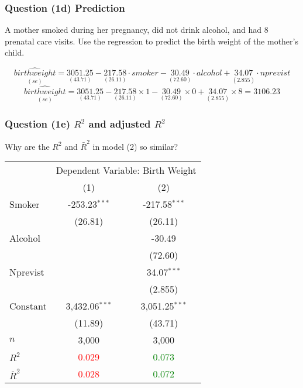 \documentclass[11pt, xcolor=x11names,compress]{beamer}
\begin{document}
\begin{frame}[fragile,t]
\frametitle{Question (1d) Prediction}
A mother smoked during her pregnancy, did not drink alcohol, and had 8 prenatal care visits. Use the regression to predict the birth weight of the mother’s child.

\pause
\begin{equation*}
    \underset{(se)}{\widehat{birthweight}} = \underset{(43.71)}{3051.25} - \underset{(26.11)}{217.58} \cdot smoker - \underset{(72.60)}{30.49}\cdot alcohol + 
    \underset{(2.855)}{34.07}\cdot nprevist
\end{equation*}
\begin{equation*}
    \underset{(se)}{\widehat{birthweight}} = \underset{(43.71)}{3051.25} - \underset{(26.11)}{217.58} \times 1 - \underset{(72.60)}{30.49}\times 0 + 
    \underset{(2.855)}{34.07}\times 8 = 3106.23
\end{equation*}

\end{frame}

\begin{frame}[fragile,t]
\frametitle{Question (1e) $R^2$ and adjusted $R^2$}\label{R2b}
Why are the $R^2$ and $\bar{R}^2$ in model (2) so similar?
\hyperlink{R2}{}
\begin{center}
\begin{threeparttable}
\begin{tabular}{lcc}
\hline 
 & \multicolumn{2}{c}{Dependent Variable: Birth Weight} \\ 
\cline{2-3} 
 & (1) & (2)\\ 
\hline 
 Smoker & -253.23$^{***}$ & -217.58$^{***}$ \\ 
  & (26.81) & (26.11) \\ 
  Alcohol &  & -30.49\\ 
  &  & (72.60) \\ 
  Nprevist &  & 34.07$^{***}$ \\ 
  &  & (2.855) \\ 
  Constant & 3,432.06$^{***}$ & 3,051.25$^{***}$ \\ 
  & (11.89) & (43.71) \\ 
 \hline 
$n$ & 3,000 & 3,000 \\ 
$R^{2}$ & \textcolor{red}{0.029} & \textcolor{green}{0.073} \\ 
$\overline{R}^{2}$ & \textcolor{red}{0.028} & \textcolor{green}{0.072} \\ 
\hline
\end{tabular} 
\begin{tablenotes}[flushleft]
\end{tablenotes}
\end{threeparttable}
\end{center}

\end{frame}
\end{document}

